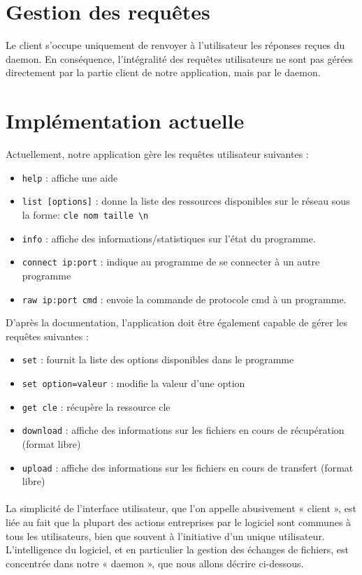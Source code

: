 	\section{Gestion des requ\^etes}

Le client s'occupe uniquement de renvoyer à l'utilisateur les réponses reçues
du daemon. En conséquence, l'intégralité des requêtes utilisateurs ne sont pas 
gérées directement par la partie client de notre application, mais par le 
daemon.
	
	\section{Implémentation actuelle}

Actuellement, notre application gère les requêtes utilisateur suivantes :
\begin{itemize}
\item \verb"help" : affiche une aide
\item \verb"list [options]" : donne la liste des ressources disponibles sur le 
      réseau sous la forme: \verb"cle nom taille \n"
\item \verb"info" : affiche des informations/statistiques sur l'état du 
      programme.
\item \verb"connect ip:port" : indique au programme de se connecter à un autre 
      programme
\item \verb"raw ip:port cmd" : envoie la commande de protocole cmd à un 
      programme. 
\end{itemize}

D'après la documentation, l'application doit être également capable de gérer 
les requêtes suivantes :
\begin{itemize}
\item \verb"set" : fournit la liste des options disponibles dans le programme
\item \verb"set option=valeur" : modifie la valeur d'une option
\item \verb"get cle" : récupère la ressource cle
\item \verb"download" : affiche des informations sur les fichiers en cours de 
      récupération (format libre)
\item \verb"upload" : affiche des informations sur les fichiers en cours de 
      transfert (format libre)
\end{itemize}
	
	\paragraph{}La simplicité de l'interface utilisateur, que l'on appelle 
	abusivement « client », est liée au fait que la plupart des actions 
	entreprises par le logiciel sont communes à tous les utilisateurs, 
	bien que souvent à l'initiative d'un unique utilisateur. L'intelligence 
	du logiciel, et en particulier la gestion des échanges de fichiers,
	est concentrée dans notre « daemon », que nous allons décrire ci-dessous.
